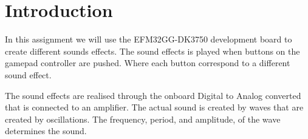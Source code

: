 \section{Introduction}
In this assignment we will use the EFM32GG-DK3750 development board to create different sounds effects. The sound effects is played when buttons on the gamepad controller are pushed. Where each button correspond to a different sound effect. 

The sound effects are realised through the  onboard Digital to Analog converted that is connected to an amplifier. The actual sound is created by waves that are created by oscillations. The frequency, period, and amplitude, of the wave determines the sound. 






    


